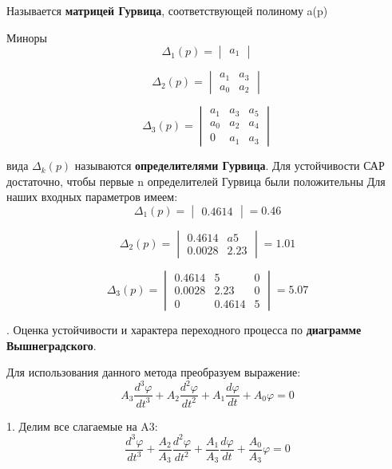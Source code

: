 \documentclass[12pt, a4paper]{report}
\def\AAAA{0.0028}
\def\AAA{0.4614}
\def\AA{2.23}
\def\A{5}
\def\D{0.46}
\def\DD{1.01}
\def\DDD{5.07}
\begin{document}
Называется \textbf{матрицей Гурвица}, соответствующей полиному a(p)

Миноры
$$
    \Delta_{1}(p) = \begin{vmatrix}
                    a_{1}
                    \end{vmatrix}
$$

$$
   \Delta_{2}(p) = \begin{vmatrix}
                    a_{1} &a_{3} \\
                    a_{0} &a_{2}
                    \end{vmatrix}
$$

$$
   \Delta_{3}(p) = \begin{vmatrix}
                    a_{1} &a_{3} &a_{5}\\
                    a_{0} &a_{2} &a_{4}\\
                    0     &a_{1} &a_{3}
                    \end{vmatrix}
$$

вида $ {\textstyle \Delta _{k}(p)} $ называются \textbf{определителями Гурвица}. Для устойчивости САР достаточно, чтобы первые n определителей Гурвица были положительны
Для наших входных параметров имеем:
$$
    \Delta_{1}(p) = \begin{vmatrix}
                    \AAA
                    \end{vmatrix} = \D
$$

$$
   \Delta_{2}(p) = \begin{vmatrix}
                    \AAA &a\A \\
                    \AAAA &\AA
                    \end{vmatrix} = \DD
$$

$$
   \Delta_{3}(p) = \begin{vmatrix}
                    \AAA  &\A   &0\\
                    \AAAA &\AA  &0\\
                    0     &\AAA &\A
                    \end{vmatrix} = \DDD
$$


. Оценка устойчивости и характера переходного процесса по \textbf{диаграмме Вышнеградского}.

Для использования данного метода преобразуем выражение:
$$ A_{3}\frac{d^{3}\varphi}{dt^{3}} + A_{2}\frac{d^{2}\varphi}{dt^{2}} + A_{1}\frac{d\varphi}{dt} + A_{0}\varphi = 0 $$

1. Делим все слагаемые на A3:
$$ \frac{d^{3}\varphi}{dt^{3}} + \frac{A_{2}}{A_{3}}\frac{d^{2}\varphi}{dt^{2}} + \frac{A_{1}}{A_{3}}\frac{d\varphi}{dt} + \frac{A_{0}}{A_{3}}\varphi = 0 $$
\end{document}
